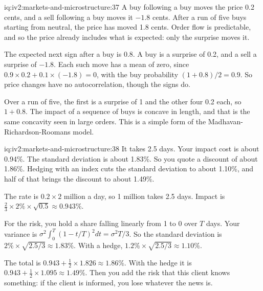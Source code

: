 \begin{solution}{iq:iv2:markets-and-microstructure:37}
A buy following a buy moves the price 0.2 cents, and a sell following a buy moves it $-1.8$ cents. After a run of five buys starting from neutral, the price has moved 1.8 cents. Order flow is predictable, and so the price already includes what is expected: only the surprise moves it.

The expected next sign after a buy is 0.8. A buy is a surprise of 0.2, and a sell a surprise of $-1.8$. Each such move has a mean of zero, since $0.9 \times 0.2 + 0.1 \times (-1.8) = 0$, with the buy probability $(1 + 0.8)/2 = 0.9$. So price changes have no autocorrelation, though the signs do.

Over a run of five, the first is a surprise of 1 and the other four 0.2 each, so $1 + 0.8$. The impact of a sequence of buys is concave in length, and that is the same concavity seen in large orders. This is a simple form of the Madhavan-Richardson-Roomans model.

\end{solution}

\begin{solution}{iq:iv2:markets-and-microstructure:38}
It takes 2.5 days. Your impact cost is about 0.94\%. The standard deviation is about 1.83\%. So you quote a discount of about 1.86\%. Hedging with an index cuts the standard deviation to about 1.10\%, and half of that brings the discount to about 1.49\%.

The rate is $0.2 \times 2$ million a day, so 1 million takes 2.5 days. Impact is $\tfrac23 \times 2\% \times \sqrt{0.5} \approx 0.943\%$.

For the risk, you hold a share falling linearly from 1 to 0 over $T$ days. Your variance is $\sigma^2\int_0^T (1 - t/T)^2 dt = \sigma^2T/3$. So the standard deviation is $2\% \times \sqrt{2.5/3} \approx 1.83\%$. With a hedge, $1.2\% \times \sqrt{2.5/3} \approx 1.10\%$.

The total is $0.943 + \tfrac12 \times 1.826 \approx 1.86\%$. With the hedge it is $0.943 + \tfrac12 \times 1.095 \approx 1.49\%$. Then you add the risk that this client knows something: if the client is informed, you lose whatever the news is.

\end{solution}

